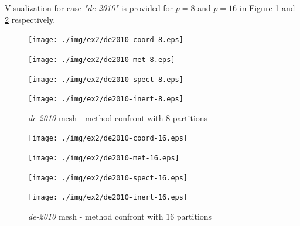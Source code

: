 \documentclass[unicode,11pt,a4paper,oneside,numbers=endperiod,openany]{scrartcl}
\begin{document}
Visualization for case \textit{"de-2010"} is provided for $p=8$ and $p=16$ in Figure \ref{fig:de2010-rec-kway-8} and
\ref{fig:de2010-rec-kway-16} respectively.

\begin{figure}[H]
    \begin{minipage}[H]{.45\textwidth}
        \centering
        \texttt{[image: ./img/ex2/de2010-coord-8.eps]}
        \label{fig:de2010-coord-8}
    \end{minipage}
    \hfill
    \begin{minipage}[H]{.45\textwidth}
        \centering
        \texttt{[image: ./img/ex2/de2010-met-8.eps]}
        \label{fig:de2010-metis-8}
    \end{minipage}
    \newline
    \begin{minipage}[H]{.45\textwidth}
        \centering
        \texttt{[image: ./img/ex2/de2010-spect-8.eps]}
        \label{fig:de2010-spec-8}
    \end{minipage}
    \hfill
    \begin{minipage}[H]{.45\textwidth}
        \centering
        \texttt{[image: ./img/ex2/de2010-inert-8.eps]}
        \label{fig:de2010-inert-8}
    \end{minipage}
    \caption{\textit{de-2010} mesh - method confront with $8$ partitions}
    \label{fig:de2010-rec-kway-8}
\end{figure}


\begin{figure}[H]
    \begin{minipage}[H]{.45\textwidth}
        \centering
        \texttt{[image: ./img/ex2/de2010-coord-16.eps]}
        \label{fig:de2010-coord-16}
    \end{minipage}
    \hfill
    \begin{minipage}[H]{.45\textwidth}
        \centering
        \texttt{[image: ./img/ex2/de2010-met-16.eps]}
        \label{fig:de2010-metis-16}
    \end{minipage}
    \newline
    \begin{minipage}[H]{.45\textwidth}
        \centering
        \texttt{[image: ./img/ex2/de2010-spect-16.eps]}
        \label{fig:de2010-spec-16}
    \end{minipage}
    \hfill
    \begin{minipage}[H]{.45\textwidth}
        \centering
        \texttt{[image: ./img/ex2/de2010-inert-16.eps]}
        \label{fig:de2010-inert-16}
    \end{minipage}
    \caption{\textit{de-2010} mesh - method confront with $16$ partitions}
    \label{fig:de2010-rec-kway-16}
\end{figure}
\cleardoublepage
\end{document}
